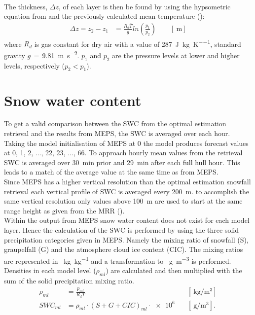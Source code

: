 \\
The thickness, $\Delta z$, of each layer is then be found by using the hypsometric equation from \cite{martin_mid-latitude_2006} and the previously calculated mean temperature ():
\begin{equation}
\begin{split}
\Delta z  = z_2 - z_1 
& = \frac{R_d \overline{T}}{g} ln\left(\frac{p_1}{p_2} \right) \qquad [\SI{}{\metre}]
\end{split}
\label{eq:hypsometric}
\end{equation}
where $R_d$ is gas constant for dry air with a value of \SI{287}{\joule\per\kilogram\per\kelvin},  standard gravity $g\,=\,$\SI{9.81}{\metre\per\square\second}. $p_1$ and $p_2$ are the pressure levels at lower and higher levels, respectively ($p_2 < p_1$).

\section{Snow water content}
To get a valid comparison between the SWC from the optimal estimation retrieval and the results from MEPS, the SWC is averaged over each hour. Taking the model initialisation of MEPS at \SI{0}{\UTC} the model produces forecast values at \SI{0}{}, \SI{1}{}, \SI{2}{}, $\ldots$, \SI{22}{}, \SI{23}{}, $\ldots$, \SI{66}{\UTC}. To approach hourly mean values from the retrieval SWC is averaged over \SI{30}{\minute} prior and \SI{29}{\minute} after each full hull hour. This leads to a match of the average value at the same time as from MEPS. \\
Since MEPS has a higher vertical resolution than the optimal estimation snowfall retrieval each vertical profile of SWC is averaged every \SI{200}{\metre}. to accomplish the same vertical resolution only values above \SI{100}{\metre} are used to start at the same range height as given from the MRR ().
\\
Within the output from MEPS snow water content does not exist for each model layer. Hence the calculation of the SWC is performed by using the three solid precipitation categories given in MEPS. Namely the mixing ratio of snowfall (S), graupelfall (G) and the atmosphere cloud ice content (CIC). The mixing ratios are represented in \SI{}{\kg\per\kg} and a transformation to \SI{}{\g\per\cubic\meter} is performed. Densities in each model level ($\rho_{ml}$) are calculated and then multiplied with the sum of the solid precipitation mixing ratio. 
\begin{align}
\rho_{ml} & = \frac{p_{ml}}{R_d T} & \quad [\SI{}{\kg\per\cubic\meter}]  \\
SWC_{ml} & = \rho_{ml} \cdot (S + G + CIC)_{ml} \cdot \num{e6} & \quad [\SI{}{\g\per\cubic\meter}].
\label{eq:SWC_ml}
\end{align}

